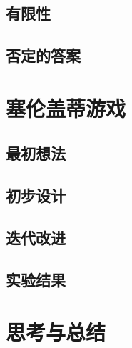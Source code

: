 \documentclass[a4paper,12pt]{article}
\begin{document}
\subsection{有限性}

\subsection{否定的答案}

\section{塞伦盖蒂游戏}

\subsection{最初想法}

\subsection{初步设计}

\subsection{迭代改进}

\subsection{实验结果}

\section{思考与总结}
\end{document}

